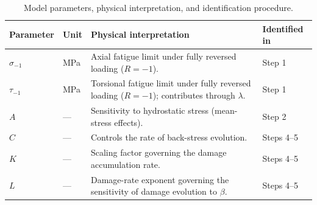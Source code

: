 \documentclass[11pt,a4paper]{article}
\newcommand{\sigm}{\sigma_{-1}}
\newcommand{\taum}{\tau_{-1}}
\begin{document}
\begin{table}[htbp]
\centering
\caption{Model parameters, physical interpretation,
and identification procedure.}
\label{tab:model_parameters}

\renewcommand{\arraystretch}{1.35}
\setlength{\tabcolsep}{8pt}

\begin{tabularx}{\textwidth}{
    @{}
    >{\centering\arraybackslash}p{}
    >{\centering\arraybackslash}p{}
    >{\raggedright\arraybackslash}X
    >{\centering\arraybackslash}p{}
    @{}
}
\toprule
\textbf{Parameter} &
\textbf{Unit} &
\textbf{Physical interpretation} &
\textbf{Identified in} \\
\midrule

$\sigm$
& MPa
& Axial fatigue limit under fully reversed
loading ($R=-1$).
& Step 1 \\

\addlinespace[3pt]

$\taum$
& MPa
& Torsional fatigue limit under fully reversed
loading ($R=-1$); contributes through $\lambda$.
& Step 1 \\

\addlinespace[3pt]

$A$
& ---
& Sensitivity to hydrostatic stress
(mean-stress effects).
& Step 2 \\

\midrule

$C$
& ---
& Controls the rate of back-stress evolution.
& Steps 4--5 \\

\addlinespace[3pt]

$K$
& ---
& Scaling factor governing the damage
accumulation rate.
& Steps 4--5 \\

\addlinespace[3pt]

$L$
& ---
& Damage-rate exponent governing the
sensitivity of damage evolution to $\beta$.
& Steps 4--5 \\

\bottomrule
\end{tabularx}
\end{table}
\end{document}
